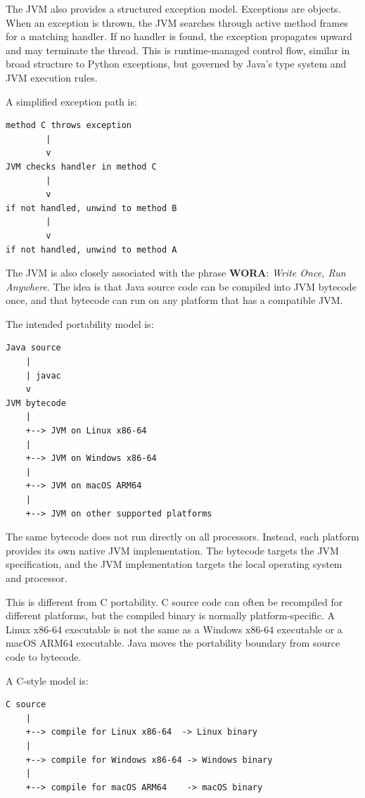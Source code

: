 The JVM also provides a structured exception model. Exceptions are objects. When an exception is thrown, the JVM searches through active method frames for a matching handler. If no handler is found, the exception propagates upward and may terminate the thread. This is runtime-managed control flow, similar in broad structure to Python exceptions, but governed by Java's type system and JVM execution rules.

A simplified exception path is:

\begin{verbatim}
method C throws exception
        |
        v
JVM checks handler in method C
        |
        v
if not handled, unwind to method B
        |
        v
if not handled, unwind to method A
\end{verbatim}

The JVM is also closely associated with the phrase \textbf{WORA}: \emph{Write Once, Run Anywhere}. The idea is that Java source code can be compiled into JVM bytecode once, and that bytecode can run on any platform that has a compatible JVM.

The intended portability model is:

\begin{verbatim}
Java source
    |
    | javac
    v
JVM bytecode
    |
    +--> JVM on Linux x86-64
    |
    +--> JVM on Windows x86-64
    |
    +--> JVM on macOS ARM64
    |
    +--> JVM on other supported platforms
\end{verbatim}

The same bytecode does not run directly on all processors. Instead, each platform provides its own native JVM implementation. The bytecode targets the JVM specification, and the JVM implementation targets the local operating system and processor.

This is different from C portability. C source code can often be recompiled for different platforms, but the compiled binary is normally platform-specific. A Linux x86-64 executable is not the same as a Windows x86-64 executable or a macOS ARM64 executable. Java moves the portability boundary from source code to bytecode.

A C-style model is:

\begin{verbatim}
C source
    |
    +--> compile for Linux x86-64  -> Linux binary
    |
    +--> compile for Windows x86-64 -> Windows binary
    |
    +--> compile for macOS ARM64    -> macOS binary
\end{verbatim}

